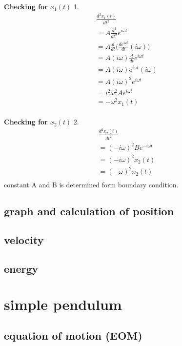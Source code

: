 	\textbf{Checking for $x_1(t)$}
	1.
	\begin{align}
		\frac{d^2x_1(t)}{dt^2} \\
		= A\frac{d^2}{dt^2}e^{i\omega t} \\
		= A\frac{d}{dt}\big(\frac{de^{i\omega t}}{dt}(i\omega)\big) \\
		= A (i \omega)\frac{d}{dt}e^{i\omega t} \\
		= A (i\omega) e^{i\omega t} (i\omega) \\
		= A (i\omega)^2 e^{i\omega t} \\
		= i^2\omega^2 Ae^{i\omega t} \\
		= - \omega^2 x_1(t)  \\
	\end{align}
	
	\textbf{Checking for $x_2(t)$}
	2.
	\begin{align}
		\frac{d^2 x_2(t)}{dt^2} \\
		= (-i\omega)^2 Be^{-i\omega t} \\
		= (-i\omega)^2 x_2(t) \\
		= (-\omega)^2 x_2(t) \\
	\end{align}
	constant A and B is determined form boundary condition.
	


\subsection{graph and calculation  of position}




\subsection{velocity}



\subsection{energy}



\section{simple pendulum}



\subsection{equation of motion (EOM)}



